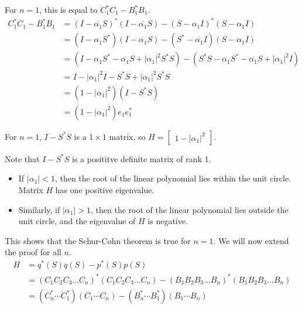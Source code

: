 \documentclass[twoside]{article}
\newcommand*\conj[1]{\overline{#1}}
\newcommand*\adj[1]{#1^*}
\newcommand*\abs[1]{\left \vert #1 \right\vert}
\theoremstyle{plain}
\theoremstyle{definition}
\theoremstyle{remark}
\begin{document}
For \(n =1\), this is equal to \(\adj{C_1} C_1 - \adj{B_1} B_1\). 
\begin{equation*}
\begin{split}
  \adj{C_1}C_1 - \adj{B_1} B_1  & = \adj{(I - \conj{\alpha_1}S)} (I - \conj{\alpha_1}S) - \adj{(S - \alpha_1 I)} (S - \alpha_1 I) \\
& = (I - \alpha_1\adj{S}) (I - \conj{\alpha_1}S) - (\adj{S} - \conj{\alpha_1} I) (S - \alpha_1 I) \\
 & = (I - \alpha_1\adj{S} - \conj{\alpha_1}S + \abs{\alpha_1}^2 \adj{S} S) - (\adj{S} S - \alpha_1 \adj{S} - \conj{\alpha_1} S + \abs{\alpha_1}^2I)\\
& = I - \abs{\alpha_1}^2 I - \adj{S} S + \abs{\alpha_1}^2 \adj{S} S \\
& = (1 - \abs{\alpha_1}^2) (I - \adj{S} S) \\
& = (1 - \abs{\alpha_1}^2) e_1 \adj{e_1} 
\end{split}
\end{equation*}

For \(n = 1\), \(I - \adj{S}S\) is a \(1 \times 1\) matrix, so \(H = \begin{bmatrix} 1 - \abs{\alpha_1}^2 \end{bmatrix}\). 



Note that \(I - \adj{S} S\) is a posititve definite matrix of rank 1. 
\begin{itemize}
\item If \(\abs{\alpha_1} < 1\), then the root of the linear polynomial lies within the unit circle. Matrix \(H\) has one positive eigenvalue.
\item Similarly, if \(\abs{\alpha_1} > 1\), then the root of the linear polynomial lies outside the unit circle, and the eigenvalue of \(H\) is negative. \end{itemize}

 This shows that the Schur-Cohn theorem is true for \(n = 1\). We will now extend the proof for all \(n\).
\begin{equation*} \begin{split}
H & =  \adj{q}(S) q(S) - \adj{p}(S) p(S) \\
&= \adj{(C_1C_2C_3 \ldots C_n)}(C_1C_2C_3\ldots C_n) - \adj{(B_1B_2B_3\ldots B_n)} (B_1B_2B_3\ldots B_n) \\
& = (\adj{C_n} \cdots \adj{C_1})( C_1 \cdots C_n) - (\adj{B_n} \cdots \adj{B_1}) (B_1 \cdots B_n) 
\end{split} \end{equation*}
\end{document}
